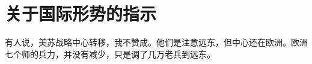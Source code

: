 \section[关于国际形势的指示（一九六七年五月）]{关于国际形势的指示}


有人说，美苏战略中心转移，我不赞成。他们是注意远东，但中心还在欧洲。欧洲七个师的兵力，并没有减少，只是调了几万老兵到远东。

